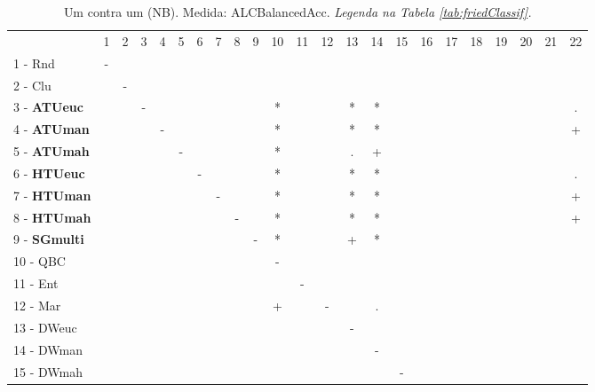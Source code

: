 \begin{table}[h]
\caption{Um contra um (NB). Medida: ALCBalancedAcc. \textit{Legenda na Tabela \ref{tab:friedClassif}.}}
\begin{center}\begin{tabular}{lcc|cc|cc|cc|cc|cc|cc|cc|cc|cc|cc}
 			& 1 & 2 & 3 & 4 & 5 & 6 & 7 & 8 & 9 & 10 & 11 & 12 & 13 & 14 & 15 & 16 & 17 & 18 & 19 & 20 & 21 & 22\\
1 - Rnd  	& - &   &   &   &   &   &   &   &   &   &   &   &   &   &   &   &   &   &   &   &   &   \\
2 - Clu  	&   & - &   &   &   &   &   &   &   &   &   &   &   &   &   &   &   &   &   &   &   &   \\ \hline
3 - \textbf{ATUeuc}	&   &   & - &   &   &   &   &   &   & * &   &   & * & * &   &   &   &   &   &   &   & . \\
4 - \textbf{ATUman}	&   &   &   & - &   &   &   &   &   & * &   &   & * & * &   &   &   &   &   &   &   & + \\ \hline
5 - \textbf{ATUmah}	&   &   &   &   & - &   &   &   &   & * &   &   & . & + &   &   &   &   &   &   &   &   \\
6 - \textbf{HTUeuc}	&   &   &   &   &   & - &   &   &   & * &   &   & * & * &   &   &   &   &   &   &   & . \\ \hline
7 - \textbf{HTUman}	&   &   &   &   &   &   & - &   &   & * &   &   & * & * &   &   &   &   &   &   &   & + \\
8 - \textbf{HTUmah}	&   &   &   &   &   &   &   & - &   & * &   &   & * & * &   &   &   &   &   &   &   & + \\ \hline
9 - \textbf{SGmulti}	&   &   &   &   &   &   &   &   & - & * &   &   & + & * &   &   &   &   &   &   &   &   \\
10 - QBC  	&   &   &   &   &   &   &   &   &   & - &   &   &   &   &   &   &   &   &   &   &   &   \\ \hline
11 - Ent  	&   &   &   &   &   &   &   &   &   &   & - &   &   &   &   &   &   &   &   &   &   &   \\
12 - Mar  	&   &   &   &   &   &   &   &   &   & + &   & - &   & . &   &   &   &   &   &   &   &   \\ \hline
13 - DWeuc	&   &   &   &   &   &   &   &   &   &   &   &   & - &   &   &   &   &   &   &   &   &   \\
14 - DWman	&   &   &   &   &   &   &   &   &   &   &   &   &   & - &   &   &   &   &   &   &   &   \\ \hline
15 - DWmah	&   &   &   &   &   &   &   &   &   &   &   &   &   &   & - &   &   &   &   &   &   &   \\

\end{tabular}
\end{center}
\end{table}

